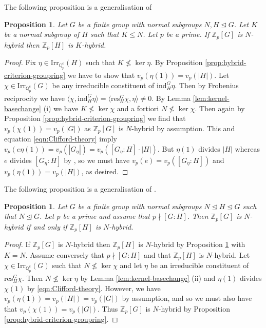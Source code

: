 \documentclass[12pt]{amsart}
\theoremstyle{plain}
\newtheorem{prop}[theorem]{Proposition}
\theoremstyle{remark}
\theoremstyle{definition}
\numberwithin{equation}{section}
\begin{document}
The following proposition is a generalisation of \cite[Proposition 2.8 (iv)]{hybrid-ETNC}

\begin{prop}\label{prop:hybrid-basechange-down}
Let $G$ be a finite group with normal subgroups $N, H \unlhd  G$.
Let $K$ be a normal subgroup of $H$ such that $K \leq N$. Let $p$ be a prime.
If  ${\mathbb{Z}}_{p}[G]$ is $N$-hybrid then ${\mathbb{Z}}_{p}[H]$ is $K$-hybrid.
\end{prop}

\begin{proof}
Fix $\eta \in {\mathrm{Irr}}_{{\mathbb{Q}}_{p}^{c}}(H)$ such that $K \not\leq \ker \eta$.
By Proposition \ref{prop:hybrid-criterion-groupring} we have to show that $v_{p}(\eta(1)) = v_{p}(|H|)$.
Let $\chi \in {\mathrm{Irr}}_{{\mathbb{Q}}_{p}^{c}}(G)$ be any irreducible constituent of ${\mathrm{ind}}^{G}_{H}  \eta$.
Then by Frobenius reciprocity we have  $\langle\chi, {\mathrm{ind}}^{G}_{H}  \eta \rangle = \langle {\mathrm{res}}^{G}_{H} \chi, \eta \rangle \neq 0$.
By Lemma \ref{lem:kernel-basechange} (i) we have $K \not\leq \ker \chi$ and a fortiori $N \not\leq \ker \chi$.
Then again by Proposition \ref{prop:hybrid-criterion-groupring} we find that
$v_{p}(\chi(1)) = v_{p}(|G|)$ as ${\mathbb{Z}}_{p}[G]$ is $N$-hybrid by assumption.
This and equation \eqref{eqn:Clifford-theory} imply $v_{p}(e \eta(1)) = v_{p}(|G_{\eta}|) = v_{p}([G_{\eta}:H] \cdot |H|)$.
But $\eta(1)$ divides $|H|$ whereas $e$ divides $[G_{\eta}:H]$ by \cite[Theorem 21.3]{MR1645304}, so we must have
$v_{p}(e) = v_{p}([G_{\eta}:H])$ and $v_{p}(\eta(1)) = v_{p}(|H|)$, as desired.
\end{proof}

The following proposition is a generalisation of \cite[Lemma 2.9]{hybrid-ETNC}.

\begin{prop} \label{prop:hybrid-basechange-up}
Let $G$ be a finite group with normal subgroups $N \unlhd H \unlhd G$ such that $N \unlhd G$.
Let $p$ be a prime and assume that $p \nmid [G:H]$.
Then ${\mathbb{Z}}_{p}[G]$ is $N$-hybrid if and only if ${\mathbb{Z}}_{p}[H]$ is $N$-hybrid.
\end{prop}

\begin{proof}
If ${\mathbb{Z}}_{p}[G]$ is $N$-hybrid then ${\mathbb{Z}}_{p}[H]$ is $N$-hybrid by Proposition \ref{prop:hybrid-basechange-down} with $K=N$.
Assume conversely that $p \nmid [G:H]$ and that ${\mathbb{Z}}_{p}[H]$ is $N$-hybrid.
Let $\chi \in {\mathrm{Irr}}_{{\mathbb{Q}}_{p}^{c}}(G)$ such that $N \not\leq \ker \chi$ and let $\eta$ be an irreducible constituent of ${\mathrm{res}}^{G}_{H} \chi$.
Then $N \not\leq \ker \eta$ by Lemma \ref{lem:kernel-basechange} (ii) and $\eta(1)$ divides $\chi(1)$ by \eqref{eqn:Clifford-theory}.
However, we have $v_{p}(\eta(1)) = v_{p}(|H|) = v_{p}(|G|)$ by assumption, and so we must also have that $v_{p}(\chi(1)) = v_{p}(|G|)$.
Thus ${\mathbb{Z}}_{p}[G]$ is $N$-hybrid by Proposition \ref{prop:hybrid-criterion-groupring}.
\end{proof}
\end{document}

